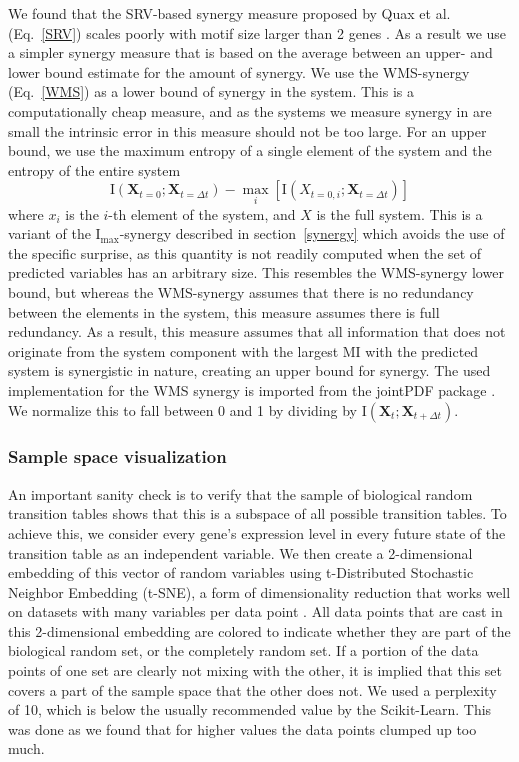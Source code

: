 \documentclass[../main.tex]{subfiles}
\begin{document}
We found that the SRV-based synergy measure proposed by Quax et al. (Eq.~\ref{SRV}) scales poorly with motif size larger than 2 genes \cite{quax2017quantifying}.
As a result we use a simpler synergy measure that is based on the average between an upper- and lower bound estimate for the amount of synergy.
We use the WMS-synergy (Eq.~\ref{WMS}) as a lower bound of synergy in the system.
This is a computationally cheap measure, and as the systems we measure synergy in are small the intrinsic error in this measure should not be too large.
For an upper bound, we use the maximum entropy of a single element of the system and the entropy of the entire system
%
\begin{equation}
\mathrm{I}\left( \mathbf{X}_{t=0}; \mathbf{X}_{t=\Delta t} \right) - \max_i [\mathrm{I}\left( X_{t=0,i};\mathbf{X}_{t=\Delta t}\right)]
\end{equation}
%
where $x_i$ is the $i$-th element of the system, and $X$ is the full system.
This is a variant of the $\mathrm{I}_\mathrm{max}$-synergy described in section~\ref{synergy} which avoids the use of the specific surprise, as this quantity is not readily computed when the set of predicted variables has an arbitrary size.
This resembles the WMS-synergy lower bound, but whereas the WMS-synergy assumes that there is no redundancy between the elements in the system, this measure assumes there is full redundancy.
As a result, this measure assumes that all information that does not originate from the system component with the largest MI with the predicted system is synergistic in nature, creating an upper bound for synergy.
The used implementation for the WMS synergy is imported from the jointPDF package \cite{jointpdf}.
We normalize this to fall between 0 and 1 by dividing by $\mathrm{I}\left( \mathbf{X}_t ; \mathbf{X}_{t + \Delta t}\right)$.

\subsubsection{Sample space visualization}

An important sanity check is to verify that the sample of biological random transition tables shows that this is a subspace of all possible transition tables.
To achieve this, we consider every gene's expression level in every future state of the transition table as an independent variable.
We then create a 2-dimensional embedding of this vector of random variables using t-Distributed Stochastic Neighbor Embedding (t-SNE), a form of dimensionality reduction that works well on datasets with many variables per data point \cite{maaten2008visualizing}.
All data points that are cast in this 2-dimensional embedding are colored to indicate whether they are part of the biological random set, or the completely random set.
If a portion of the data points of one set are clearly not mixing with the other, it is implied that this set covers a part of the sample space that the other does not.
We used a perplexity of 10, which is below the usually recommended value by the Scikit-Learn.
This was done as we found that for higher values the data points clumped up too much.
\end{document}

